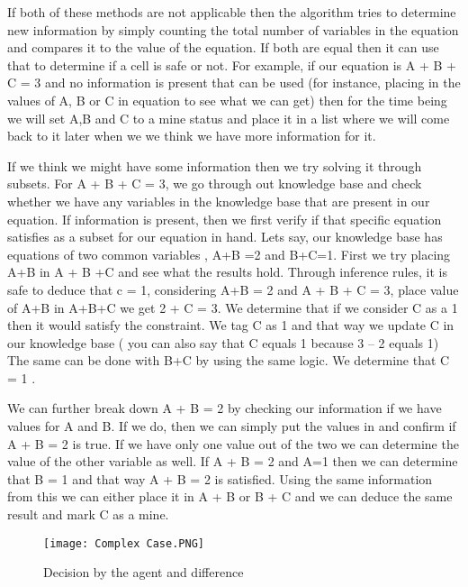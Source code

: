 \documentclass{article}
\begin{document}
If both of these methods are not applicable then the algorithm tries to determine new information by simply counting the total number of variables in the equation and compares it to the value of the equation. If both are equal then it can use that to determine if a cell is safe or not. For example, if our equation is A + B + C = 3 and no information is present that can be used (for instance, placing in the values of A, B or C in equation to see what we can get) then for the time being we will set A,B and C to a mine status and place it in a list where we will come back to it later when we we think we have more information for it.  

If we think we might have some information then we try solving it through subsets. For A + B + C = 3, we go through out knowledge base and check whether we have any variables in the knowledge base that are present in our equation. If  information is present, then we first verify if that specific equation satisfies as a subset for our equation in hand. Lets say, our knowledge base has equations of two common variables , A+B =2 and B+C=1. First we try placing A+B in A + B +C and see what the results hold. Through inference rules, it is safe to deduce that c = 1, considering A+B = 2 and A + B + C = 3, place value of A+B in A+B+C we get 2 + C = 3. 
We determine that if we consider C as a 1 then it would satisfy the constraint. We tag C as 1 and that way we update C in our knowledge base ( you can also say that C equals 1 because 3 – 2 equals 1) The same can be done with B+C by using the same logic. We determine that C = 1 . 

We can further break down A + B = 2 by checking our information if we have values for A and B. If we do, then we can simply put the values in and confirm if  A + B = 2 is true. If we have only one value out of the two we can determine the value of the other variable as well. If A + B = 2 and A=1 then we can determine that B = 1 and that way A + B = 2 is satisfied.  Using the same information from this we can either place it in A + B or B + C and we can deduce the same result and mark C as a mine.


\begin{figure}[htp]
    \centering
    \texttt{[image: Complex Case.PNG]}
    \caption{Decision by the agent and difference}
    \label{fig:board}
\end{figure}
\end{document}
